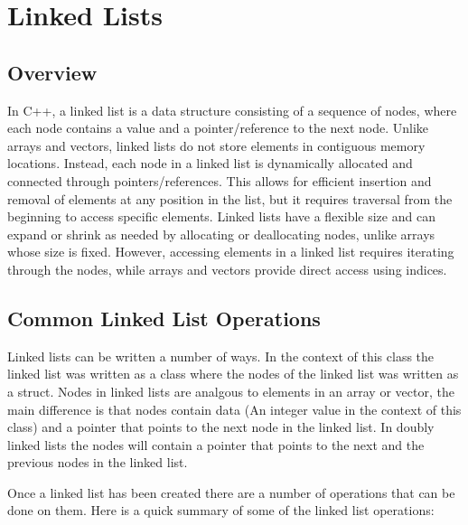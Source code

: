 \section*{Linked Lists}

\subsection*{Overview}

In C++, a linked list is a data structure consisting of a sequence of nodes, where each node contains a value and a pointer/reference to the next node. Unlike arrays and vectors, linked lists do not 
store elements in contiguous memory locations. Instead, each node in a linked list is dynamically allocated and connected through pointers/references. This allows for efficient insertion and removal 
of elements at any position in the list, but it requires traversal from the beginning to access specific elements. Linked lists have a flexible size and can expand or shrink as needed by allocating 
or deallocating nodes, unlike arrays whose size is fixed. However, accessing elements in a linked list requires iterating through the nodes, while arrays and vectors provide direct access using indices.

\subsection*{Common Linked List Operations}

Linked lists can be written a number of ways. In the context of this class the linked list was written as a class where the nodes of the linked list was written as a struct. Nodes in linked lists are
analgous to elements in an array or vector, the main difference is that nodes contain data (An integer value in the context of this class) and a pointer that points to the next node in the linked list.
In doubly linked lists the nodes will contain a pointer that points to the next and the previous nodes in the linked list. 

Once a linked list has been created there are a number of operations that can be done on them. Here is a quick summary of some of the linked list operations:

